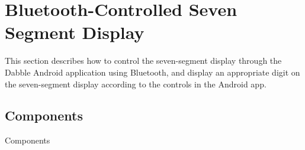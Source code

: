 \section{Bluetooth-Controlled Seven Segment Display}
This section describes how to control the seven-segment display through the
Dabble Android application using Bluetooth, and display an appropriate digit on 
the seven-segment display according to the controls in the Android app.

\subsection{Components}

\begin{table}[!ht]
\centering

\caption{Components}
\label{table:ble-components}
\end{table}
